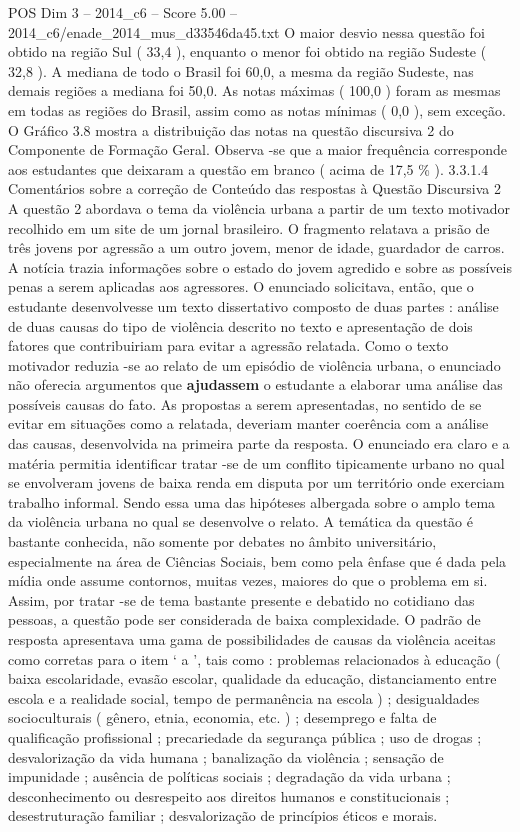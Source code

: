 \begin{textsample}{POS Dim 3 – 2014\_c6 – Score 5.00 – 2014\_c6/enade\_2014\_mus\_d33546da45.txt}
O maior desvio nessa questão foi obtido na região Sul ( 33,4 ), enquanto o menor foi obtido na região Sudeste ( 32,8 ).
A mediana de todo o Brasil foi 60,0, a mesma da região Sudeste, nas demais regiões a mediana foi 50,0.
As notas máximas ( 100,0 ) foram as mesmas em todas as regiões do Brasil, assim como as notas mínimas ( 0,0 ), sem exceção.
O Gráfico 3.8 mostra a distribuição das notas na questão discursiva 2 do Componente de Formação Geral.
Observa -se que a maior frequência corresponde aos estudantes que deixaram a questão em branco ( acima de 17,5 \% ). 3.3.1.4 Comentários sobre a correção de Conteúdo das respostas à Questão Discursiva 2 A questão 2 abordava o tema da violência urbana a partir de um texto motivador recolhido em um site de um jornal brasileiro.
O fragmento relatava a prisão de três jovens por agressão a um outro jovem, menor de idade, guardador de carros.
A notícia trazia informações sobre o estado do jovem agredido e sobre as possíveis penas a serem aplicadas aos agressores.
O enunciado solicitava, então, que o estudante desenvolvesse um texto dissertativo composto de duas partes : análise de duas causas do tipo de violência descrito no texto e apresentação de dois fatores que contribuiriam para evitar a agressão relatada.
Como o texto motivador reduzia -se ao relato de um episódio de violência urbana, o enunciado não oferecia argumentos que \textbf{ajudassem} o estudante a elaborar uma análise das possíveis causas do fato.
As propostas a serem apresentadas, no sentido de se evitar em situações como a relatada, deveriam manter coerência com a análise das causas, desenvolvida na primeira parte da resposta.
O enunciado era claro e a matéria permitia identificar tratar -se de um conflito tipicamente urbano no qual se envolveram jovens de baixa renda em disputa por um território onde exerciam trabalho informal.
Sendo essa uma das hipóteses albergada sobre o amplo tema da violência urbana no qual se desenvolve o relato.
A temática da questão é bastante conhecida, não somente por debates no âmbito universitário, especialmente na área de Ciências Sociais, bem como pela ênfase que é dada pela mídia onde assume contornos, muitas vezes, maiores do que o problema em si.
Assim, por tratar -se de tema bastante presente e debatido no cotidiano das pessoas, a questão pode ser considerada de baixa complexidade.
O padrão de resposta apresentava uma gama de possibilidades de causas da violência aceitas como corretas para o item ‘ a ’, tais como : problemas relacionados à educação ( baixa escolaridade, evasão escolar, qualidade da educação, distanciamento entre escola e a realidade social, tempo de permanência na escola ) ; desigualdades socioculturais ( gênero, etnia, economia, etc. ) ; desemprego e falta de qualificação profissional ; precariedade da segurança pública ; uso de drogas ; desvalorização da vida humana ; banalização da violência ; sensação de impunidade ; ausência de políticas sociais ; degradação da vida urbana ; desconhecimento ou desrespeito aos direitos humanos e constitucionais ; desestruturação familiar ; desvalorização de princípios éticos e morais.

\end{textsample}
